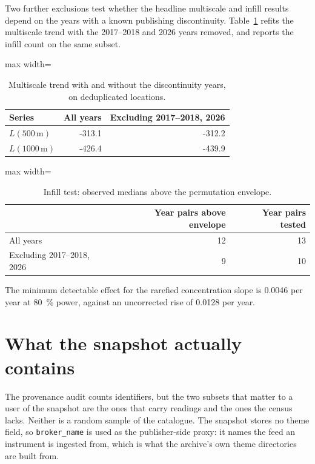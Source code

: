 \documentclass[fleqn,10pt]{wlpeerj}
\begin{document}
Two further exclusions test whether the headline multiscale and infill results depend on the
years with a known publishing discontinuity. Table~\ref{si:excl} refits the multiscale trend with
the 2017--2018 and 2026 years removed, and reports the infill count on the same subset.

\begin{table}[H]
\centering
\caption{Multiscale trend with and without the discontinuity years, on deduplicated locations.}
\label{si:excl}
\small
\begin{adjustbox}{max width=\linewidth}
\begin{tabular}{lrr}
\toprule
Series & All years & Excluding 2017--2018, 2026 \\
\midrule
$L(500\,\mathrm{m})$ & -313.1 & -312.2 \\
$L(1000\,\mathrm{m})$ & -426.4 & -439.9 \\
\bottomrule
\end{tabular}
\end{adjustbox}
\end{table}

\begin{table}[H]
\centering
\caption{Infill test: observed medians above the permutation envelope.}
\label{si:inflexcl}
\small
\begin{adjustbox}{max width=\linewidth}
\begin{tabular}{lrr}
\toprule
 & Year pairs above envelope & Year pairs tested \\
\midrule
All years & 12 & 13 \\
Excluding 2017--2018, 2026 & 9 & 10 \\
\bottomrule
\end{tabular}
\end{adjustbox}
\end{table}

The minimum detectable effect for the rarefied concentration slope is
0.0046 per year at \SI{80}{\percent} power, against an uncorrected rise of
0.0128 per year.

\section{What the snapshot actually contains}
\label{si:provenance}

The provenance audit counts identifiers, but the two subsets that matter to a user of the
snapshot are the ones that carry readings and the ones the census lacks. Neither is a random
sample of the catalogue. The snapshot stores no theme field, so \texttt{broker\_name} is used
as the publisher-side proxy: it names the feed an instrument is ingested from, which is what
the archive's own theme directories are built from.
\end{document}
